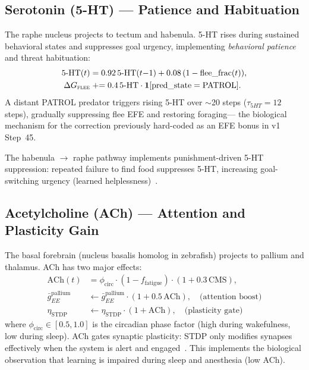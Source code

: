 \documentclass[11pt,a4paper]{article}
\begin{document}
\subsection{Serotonin (5-HT) --- Patience and Habituation}

The raphe nucleus projects to tectum and habenula.
5-HT rises during sustained behavioral states and suppresses goal urgency,
implementing \emph{behavioral patience} and threat habituation:
\begin{equation}\label{eq:serotonin}
\begin{aligned}
  \text{5-HT}(t) &= 0.92\,\text{5-HT}(t{-}1) + 0.08\,(1 - \text{flee\_frac}(t)), \\
  \Delta G_\textsc{flee} &\mathrel{+}= 0.4\,\text{5-HT} \cdot \mathbf{1}[\text{pred\_state}=\text{PATROL}].
\end{aligned}
\end{equation}
A distant PATROL predator triggers rising 5-HT over $\sim$20 steps
($\tau_{5HT} = 12$ steps), gradually suppressing flee EFE and restoring foraging---
the biological mechanism for the correction previously hard-coded
as an EFE bonus in v1 Step~45.

The habenula $\to$ raphe pathway implements punishment-driven 5-HT suppression:
repeated failure to find food suppresses 5-HT, increasing goal-switching
urgency (learned helplessness)~\cite{amo2014}.

\subsection{Acetylcholine (ACh) --- Attention and Plasticity Gain}

The basal forebrain (nucleus basalis homolog in zebrafish) projects to
pallium and thalamus.
ACh has two major effects:
\begin{equation}\label{eq:ach}
\begin{aligned}
  \text{ACh}(t) &= \phi_\text{circ} \cdot (1 - f_\text{fatigue}) \cdot (1 + 0.3\,\text{CMS}), \\
  \bar{g}_{EE}^\text{pallium} &\leftarrow \bar{g}_{EE}^\text{pallium} \cdot (1 + 0.5\,\text{ACh}),
  \quad\text{(attention boost)} \\
  \eta_\text{STDP} &\leftarrow \eta_\text{STDP} \cdot (1 + \text{ACh}),
  \quad\text{(plasticity gate)}
\end{aligned}
\end{equation}
where $\phi_\text{circ} \in [0.5, 1.0]$ is the circadian phase factor
(high during wakefulness, low during sleep).
ACh gates synaptic plasticity: STDP only modifies synapses effectively
when the system is alert and engaged~\cite{kirkwood1999}.
This implements the biological observation that learning is impaired
during sleep and anesthesia (low ACh).
\end{document}
